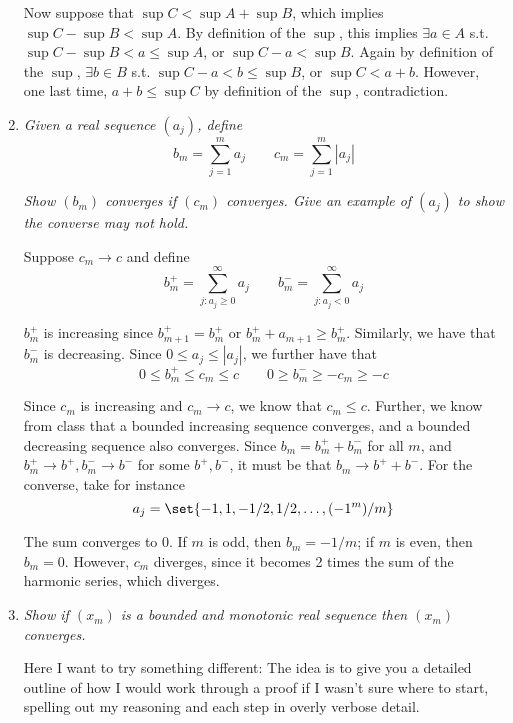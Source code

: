 \documentclass{article}
\begin{document}
\begin{enumerate}[1.]
      Now suppose that $\sup C < \sup A + \sup B$, which implies $\sup C - \sup B < \sup A$. By definition of the $\sup$, this implies $\exists a \in A$ s.t. $\sup C - \sup B < a \le \sup A$, or $\sup C - a < \sup B$. Again by definition of the $\sup$, $\exists b \in B$ s.t. $\sup C - a < b \le \sup B$, or $\sup C < a + b$. However, one last time, $a + b \le \sup C$ by definition of the $\sup$, contradiction.

  \item \textit{Given a real sequence $(a_j)$, define}
    \[
        b_m = \sum^{m}_{j = 1} a_j
        \quad\quad
        c_m = \sum^{m}_{j = 1} |a_j|
    \]

    \textit{Show $(b_m)$ converges if $(c_m)$ converges. Give an example of $(a_j)$ to show the converse may not hold.}

      \solution Suppose $c_m \to c$ and define 
      \[
          b_m^+ = \sum^{\infty}_{j: a_j \ge 0} a_j
          \quad\quad
          b_m^- = \sum^{\infty}_{j: a_j < 0} a_j
      \]

      $b_m^+$ is increasing since $b_{m + 1}^+ = b_m^+$ or $b_m^+ + a_{m +1} \ge b_m^+$. Similarly, we have that $b_m^-$ is decreasing. Since $0 \le a_j \le |a_j|$, we further have that
      \[
          0 \le b_m^+ \le c_m \le c
          \quad\quad
          0 \ge b_m^- \ge -c_m \ge -c
      \]

      Since $c_m$ is increasing and $c_m \to c$, we know that $c_m \le c$. Further, we know from class that a bounded increasing sequence converges, and a bounded decreasing sequence also converges. Since $b_m = b_m^+ + b_m^-$ for all $m$, and $b_m^+ \to b^+, b_m^- \to b^-$ for some $b^+, b^-$, it must be that $b_m \to b^+ + b^-$. For the converse, take for instance
      \[
          a_j = \set{-1, 1, -1 / 2, 1 / 2, \ldots, (-1^m) / m}
      \]

      The sum converges to 0. If $m$ is odd, then $b_m = -1 / m$; if $m$ is even, then $b_m = 0$. However, $c_m$ diverges, since it becomes 2 times the sum of the harmonic series, which diverges.

  \item \textit{Show if $(x_m)$ is a bounded and monotonic real sequence then $(x_m)$ converges.}

    \solution Here I want to try something different: The idea is to give you a detailed outline of how I would work through a proof if I wasn't sure where to start, spelling out my reasoning and each step in overly verbose detail.


\end{enumerate}
\end{document}
